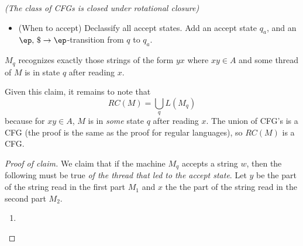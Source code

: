 \begin{problem}{\it(The class of CFGs is closed under rotational closure)}
\begin{itemize}
Basically, instead of adding $c$, we have the option of ``matching" it up with a $c^{-1}$ already on the stack. Recall that the $c^{-1}$ represents an element we guessed would be on the stack when we got to $q$.
\item (When to accept)
Declassify all accept states. Add an accept state $q_a$, and an $\ep,\,\$\to \ep$-transition from $q$ to $q_a$.
\begin{center}
\end{center}
\end{itemize}
\begin{clm}
$M_q$ recognizes exactly those strings of the form $yx$ where $xy\in A$ and some thread of $M$ is in state $q$ after reading $x$.
\end{clm}\label{clm:787-1-7}
Given this claim, it remains to note that
\[
RC(M)=\bigcup_q L(M_q)
\]
because for $xy\in A$, $M$ is in {\it some} state $q$ after reading $x$. The union of CFG's is a CFG (the proof is the same as the proof for regular languages), so $RC(M)$ is a CFG.
\begin{proof}[Proof of claim]
%
%
We claim that if the machine $M_q$ accepts a string $w$, then the following must be true {\it of the thread that led to the accept state}. Let $y$ be the part of the string read in the first part $M_1$ and $x$ the the part of the string read in the second part $M_2$.
\begin{enumerate}
\item

\end{enumerate}
\end{proof}
\end{problem}
